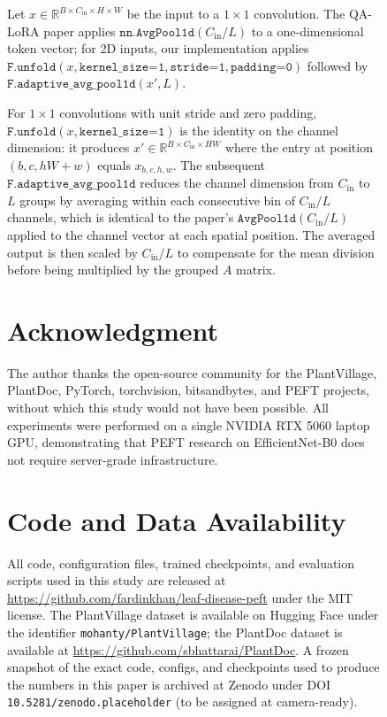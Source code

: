\documentclass[conference]{IEEEtran}
\begin{document}
\begin{figure}[htbp]
Let $x \in \mathbb{R}^{B\times C_{\text{in}}\times H\times W}$ be the input to a $1\times 1$ convolution. The QA-LoRA paper applies $\texttt{nn.AvgPool1d}(C_{\text{in}}/L)$ to a one-dimensional token vector; for 2D inputs, our implementation applies $\texttt{F.unfold}(x, \texttt{kernel\_size=1}, \texttt{stride=1}, \texttt{padding=0})$ followed by $\texttt{F.adaptive\_avg\_pool1d}(x', L)$.

For $1\times 1$ convolutions with unit stride and zero padding, $\texttt{F.unfold}(x, \texttt{kernel\_size=1})$ is the identity on the channel dimension: it produces $x' \in \mathbb{R}^{B\times C_{\text{in}}\times H W}$ where the entry at position $(b, c, hW+w)$ equals $x_{b, c, h, w}$. The subsequent $\texttt{F.adaptive\_avg\_pool1d}$ reduces the channel dimension from $C_{\text{in}}$ to $L$ groups by averaging within each consecutive bin of $C_{\text{in}}/L$ channels, which is identical to the paper's $\texttt{AvgPool1d}(C_{\text{in}}/L)$ applied to the channel vector at each spatial position. The averaged output is then scaled by $C_{\text{in}}/L$ to compensate for the mean division before being multiplied by the grouped $A$ matrix.

\section*{Acknowledgment}
The author thanks the open-source community for the PlantVillage, PlantDoc, PyTorch, torchvision, bitsandbytes, and PEFT projects, without which this study would not have been possible. All experiments were performed on a single NVIDIA RTX 5060 laptop GPU, demonstrating that PEFT research on EfficientNet-B0 does not require server-grade infrastructure.

\section*{Code and Data Availability}
All code, configuration files, trained checkpoints, and evaluation scripts used in this study are released at \url{https://github.com/fardinkhan/leaf-disease-peft} under the MIT license. The PlantVillage dataset is available on Hugging Face under the identifier \texttt{mohanty/PlantVillage}; the PlantDoc dataset is available at \url{https://github.com/sbhattarai/PlantDoc}. A frozen snapshot of the exact code, configs, and checkpoints used to produce the numbers in this paper is archived at Zenodo under DOI \texttt{10.5281/zenodo.placeholder} (to be assigned at camera-ready).


\end{figure}
\end{document}
